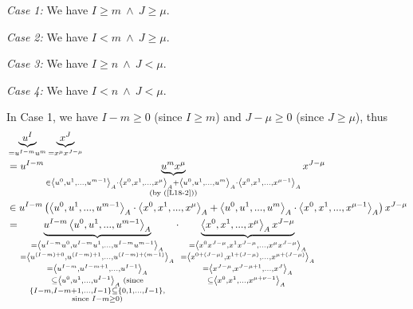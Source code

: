\documentclass[12pt,final,notitlepage,onecolumn]{article}%
\begin{document}
\textit{Case 1:} We have $I\geq m\ \wedge\ J\geq\mu$.

\textit{Case 2:} We have $I<m\ \wedge\ J\geq\mu$.

\textit{Case 3:} We have $I\geq n\ \wedge\ J<\mu$.

\textit{Case 4:} We have $I<n\ \wedge\ J<\mu$.

In Case 1, we have $I-m\geq0$ (since $I\geq m$) and $J-\mu\geq0$ (since
$J\geq\mu$), thus%
\begin{align*}
&  \underbrace{u^{I}}_{=u^{I-m}u^{m}}\underbrace{x^{J}}_{=x^{\mu}x^{J-\mu}}\\
&  =u^{I-m}\underbrace{u^{m}x^{\mu}}_{\substack{\in\left\langle u^{0}%
,u^{1},...,u^{m-1}\right\rangle _{A}\cdot\left\langle x^{0},x^{1},...,x^{\mu
}\right\rangle _{A}+\left\langle u^{0},u^{1},...,u^{m}\right\rangle _{A}%
\cdot\left\langle x^{0},x^{1},...,x^{\mu-1}\right\rangle _{A}\\\left(
\text{by (\ref{L18-2})}\right)  }}x^{J-\mu}\\
&  \in u^{I-m}\left(  \left\langle u^{0},u^{1},...,u^{m-1}\right\rangle
_{A}\cdot\left\langle x^{0},x^{1},...,x^{\mu}\right\rangle _{A}+\left\langle
u^{0},u^{1},...,u^{m}\right\rangle _{A}\cdot\left\langle x^{0},x^{1}%
,...,x^{\mu-1}\right\rangle _{A}\right)  x^{J-\mu}\\
&  =\underbrace{u^{I-m}\left\langle u^{0},u^{1},...,u^{m-1}\right\rangle _{A}%
}_{\substack{=\left\langle u^{I-m}u^{0},u^{I-m}u^{1},...,u^{I-m}%
u^{m-1}\right\rangle _{A}\\=\left\langle u^{\left(  I-m\right)  +0},u^{\left(
I-m\right)  +1},...,u^{\left(  I-m\right)  +\left(  m-1\right)  }\right\rangle
_{A}\\=\left\langle u^{I-m},u^{I-m+1},...,u^{I-1}\right\rangle _{A}%
\\\subseteq\left\langle u^{0},u^{1},...,u^{I-1}\right\rangle _{A}\text{
(since}\\\left\{  I-m,I-m+1,...,I-1\right\}  \subseteq\left\{
0,1,...,I-1\right\}  ,\\\text{since }I-m\geq0\text{)}}}\cdot
\underbrace{\left\langle x^{0},x^{1},...,x^{\mu}\right\rangle _{A}x^{J-\mu}%
}_{\substack{=\left\langle x^{0}x^{J-\mu},x^{1}x^{J-\mu},...,x^{\mu}x^{J-\mu
}\right\rangle _{A}\\=\left\langle x^{0+\left(  J-\mu\right)  },x^{1+\left(
J-\mu\right)  },...,x^{\mu+\left(  J-\mu\right)  }\right\rangle _{A}%
\\=\left\langle x^{J-\mu},x^{J-\mu+1},...,x^{J}\right\rangle _{A}%
\\\subseteq\left\langle x^{0},x^{1},...,x^{\mu+\nu-1}\right\rangle _{A}\text{
}}}
\end{align*}
\end{document}
